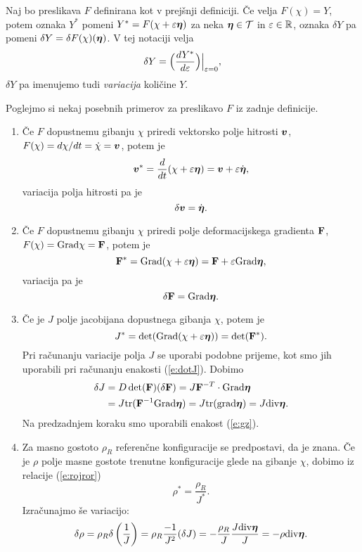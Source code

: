 \begin{notacija}
	Naj bo preslikava $F$ definirana kot v prejšnji definiciji. Če velja $F(\chi)=Y$,
	potem oznaka $Y^*$ pomeni $Y^*=F(\chi+\varepsilon\boldsymbol \eta)$ za neka $\boldsymbol \eta\in\mathcal{T}$ in $\varepsilon\in\mathbb R$,
	oznaka $\delta Y$ pa pomeni $\delta Y=\delta F(\chi)(\boldsymbol \eta)$. V tej notaciji velja
	\[ \delta Y = \Big(\frac{dY^*}{d\varepsilon}\Big)\Big|_{\varepsilon=0}, \]
	$\delta Y$ pa imenujemo tudi \emph{variacija} količine $Y$.
\end{notacija}

\begin{primeri}
	Poglejmo si nekaj posebnih primerov za preslikavo $F$ iz zadnje definicije.
	\begin{enumerate}
		\item
			Če $F$ dopustnemu gibanju $\chi$ priredi vektorsko polje hitrosti $\boldsymbol v$,
			$F(\chi)=d\chi/dt=\dot{\chi}=\boldsymbol v$, potem je
			\[ \boldsymbol v^*=\frac{d}{dt}(\chi+\varepsilon\boldsymbol \eta)=\boldsymbol v+\varepsilon\dot{\boldsymbol \eta}, \]
			variacija polja hitrosti pa je
			\[ \delta\boldsymbol v=\dot{\boldsymbol \eta}. \]
		\item
			Če $F$ dopustnemu gibanju $\chi$ priredi polje deformacijskega gradienta $\mathbf F$,
			$F(\chi)=\mathrm{Grad}{\chi}=\mathbf F$, potem je
			\[ \mathbf F^*=\mathrm{Grad}(\chi+\varepsilon\boldsymbol \eta)=\mathbf F+\varepsilon\mathrm{Grad}\boldsymbol \eta, \]
			variacija pa je
			\[ \delta\mathbf F=\mathrm{Grad}\boldsymbol \eta. \]
		\item
			Če je $J$ polje jacobijana dopustnega gibanja $\chi$, potem je
			\[ J^*=\det(\mathrm{Grad}(\chi+\varepsilon\boldsymbol \eta))=\det(\mathbf F^*). \]
			Pri računanju variacije polja $J$ se uporabi podobne prijeme,
			kot smo jih uporabili pri računanju enakosti (\ref{e:dotJ}). Dobimo
			\begin{align*}
				\delta J&=D\det(\mathbf F)(\delta\mathbf F)=J\mathbf F^{-T}\cdot\mathrm{Grad}\boldsymbol \eta\\
				&=J\mathrm{tr}(\mathbf F^{-1}\mathrm{Grad}\boldsymbol \eta)=J\mathrm{tr}(\mathrm{grad}\boldsymbol \eta)=J\mathrm{div}\boldsymbol \eta.
			\end{align*}
			Na predzadnjem koraku smo uporabili enakost (\ref{e:gz}).
		\item
			Za masno gostoto $\rho_R$ referenčne konfiguracije se predpostavi, da je znana. Če je
			$\rho$ polje masne gostote trenutne konfiguracije glede na gibanje $\chi$,
			dobimo iz relacije (\ref{e:rojror})
			\[ \rho^*=\frac{\rho_R}{J^*}. \]
			Izračunajmo še variacijo:
			\[
				\delta\rho=\rho_R\delta\left(\frac{1}{J}\right)=
				\rho_R\frac{-1}{J^2}(\delta J)=-\frac{\rho_R}{J}\frac{J\mathrm{div}\boldsymbol \eta}{J}=-\rho\mathrm{div}\boldsymbol \eta.
			\]
	\end{enumerate}
\end{primeri}


